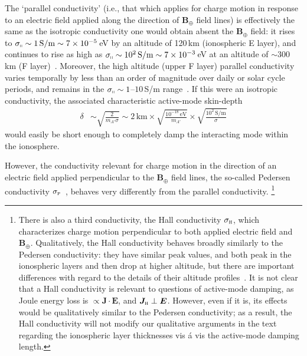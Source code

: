 \documentclass[amsmath,amssymb,aps,10pt,prd,letterpaper,nofootinbib,balancelastpage,notitlepage,superscriptaddress,twocolumn,floatfix]{revtex4-2}
\begin{document}
The `parallel conductivity' (i.e., that which applies for charge motion in response to an electric field applied along the direction of $\bm{B}_{\oplus}$ field lines) is effectively the same as the isotropic conductivity one would obtain absent the $\bm{B}_{\oplus}$ field: it rises to $\sigma_{\shortparallel} \sim 1\,\text{S/m} \sim 7\times 10^{-5}$\,eV by an altitude of 120\,km (ionospheric E layer), and continues to rise as high as $\sigma_\shortparallel \sim 10^2\,\text{S/m}\sim 7\times 10^{-3}$\,eV at an altitude of $\sim 300\,$km (F layer)~\cite{Takeda:1985hcf,GM118}.
Moreover, the high altitude (upper F layer) parallel conductivity varies temporally by less than an order of magnitude over daily or solar cycle periods, and remains in the $\sigma_{\shortparallel} \sim 1$--$10$\,S/m range~\cite{Takeda:1985hcf}.
If this were an isotropic conductivity, the associated characteristic active-mode skin-depth
\begin{align}
    \delta &
    \sim \sqrt{\frac{2}{m_{A'}\sigma}}
    \sim 2\,\text{km}\times \sqrt{\frac{10^{-18}\,\text{eV}}{m_{A'}}} \times \sqrt{\frac{10^{2}\,\text{S/m}}{\sigma}}
\end{align}
would easily be short enough to completely damp the interacting mode within the ionosphere.

However, the conductivity relevant for charge motion in the direction of an electric field applied perpendicular to the $\bm{B}_{\oplus}$ field lines, the so-called Pedersen conductivity $\sigma_{\textsc{p}}$~\cite{Takeda:1985hcf,GM118}, behaves very differently from the parallel conductivity.%
\footnote{\label{ftnt:Hall}%
    There is also a third conductivity, the Hall conductivity $\sigma_{\textsc{h}}$, which characterizes charge motion perpendicular to both applied electric field and $\bm{B}_{\oplus}$.
    Qualitatively, the Hall conductivity behaves broadly similarly to the Pedersen conductivity: they have similar peak values, and both peak in the ionospheric layers and then drop at higher altitude, but there are important differences with regard to the details of their altitude profiles~\cite{Takeda:1985hcf,GM118}.
    It is not clear that a Hall conductivity is relevant to questions of active-mode damping, as Joule energy loss is $\propto \bm{J}\cdot\bm{E}$, and $\bm{J}_{\textsc{h}} \perp \bm{E}$.
    However, even if it is, its effects would be qualitatively similar to the Pedersen conductivity; as a result, the Hall conductivity will not modify our qualitative arguments in the text regarding the ionospheric layer thicknesses vis \'a vis the active-mode damping length.
} %
\end{document}
